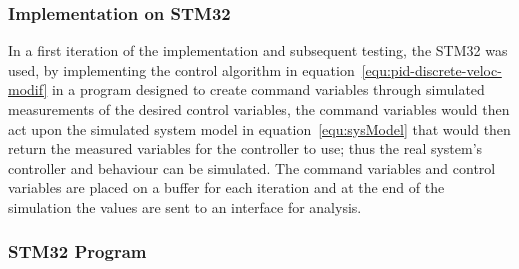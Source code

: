 \subsubsection{Implementation on STM32}
\label{sec::stmImp}
In a first iteration of the implementation and subsequent testing, the STM32 was used, by implementing the control algorithm in equation~\ref{equ:pid-discrete-veloc-modif} in a program designed to create command variables through simulated measurements of the desired control variables, the command variables would then act upon the simulated system model in equation~\ref{equ:sysModel} that would then return the measured variables for the controller to use; thus the real system's controller and behaviour can be simulated.
The command variables and control variables are placed on a buffer for each iteration and at the end of the simulation the values are sent to an interface for analysis.
\subsubsection{STM32 Program}

